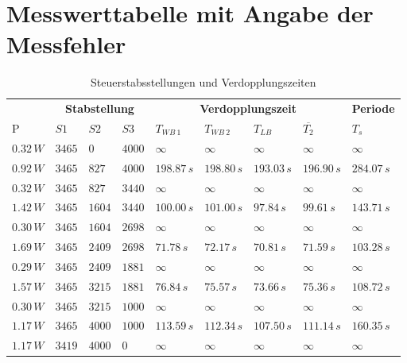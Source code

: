 \documentclass[12pt,german]{article}
\begin{document}
    \section{Messwerttabelle mit Angabe der Messfehler}
    \begin{table}[H]
        \begin{tabularx}{\textwidth}{X|X|X|X|X|X|X|X|X}
            \toprule
            & \multicolumn{3}{c|}{\textbf{Stabstellung}} & \multicolumn{4}{c|}{\textbf{Verdopplungszeit}} & \textbf{Periode} \\
            \cmidrule{2-4}\cmidrule{5-8}
            P & $S1$ & $S2$ & $S3$ & $T_{WB\: 1}$ & $T_{WB\: 2}$ & $T_{LB}$ & $\overline{T_{2}}$ & $T_s$ \\
            \midrule
            $0.32\, W$ & $3465$ & $   0$ & $4000$ & $  \infty  $ & $  \infty  $ & $  \infty  $ & $  \infty  $ & $  \infty  $ \\
            $0.92\, W$ & $3465$ & $ 827$ & $4000$ & $198.87\, s$ & $198.80\, s$ & $193.03\, s$ & $196.90\, s$ & $284.07\, s$ \\
            $0.32\, W$ & $3465$ & $ 827$ & $3440$ & $  \infty  $ & $  \infty  $ & $  \infty  $ & $  \infty  $ & $  \infty  $ \\
            $1.42\, W$ & $3465$ & $1604$ & $3440$ & $100.00\, s$ & $101.00\, s$ & $ 97.84\, s$ & $ 99.61\, s$ & $143.71\, s$ \\
            $0.30\, W$ & $3465$ & $1604$ & $2698$ & $  \infty  $ & $  \infty  $ & $  \infty  $ & $  \infty  $ & $  \infty  $ \\
            $1.69\, W$ & $3465$ & $2409$ & $2698$ & $ 71.78\, s$ & $ 72.17\, s$ & $ 70.81\, s$ & $ 71.59\, s$ & $103.28\, s$ \\
            $0.29\, W$ & $3465$ & $2409$ & $1881$ & $  \infty  $ & $  \infty  $ & $  \infty  $ & $  \infty  $ & $  \infty  $ \\
            $1.57\, W$ & $3465$ & $3215$ & $1881$ & $ 76.84\, s$ & $ 75.57\, s$ & $ 73.66\, s$ & $ 75.36\, s$ & $108.72\, s$ \\
            $0.30\, W$ & $3465$ & $3215$ & $1000$ & $  \infty  $ & $  \infty  $ & $  \infty  $ & $  \infty  $ & $  \infty  $ \\
            $1.17\, W$ & $3465$ & $4000$ & $1000$ & $113.59\, s$ & $112.34\, s$ & $107.50\, s$ & $111.14\, s$ & $160.35\, s$ \\
            $1.17\, W$ & $3419$ & $4000$ & $   0$ & $  \infty  $ & $  \infty  $ & $  \infty  $ & $  \infty  $ & $  \infty  $ \\
            \bottomrule
        \end{tabularx}
        \caption{Steuerstabsstellungen und Verdopplungszeiten}
    \end{table}
\end{document}
